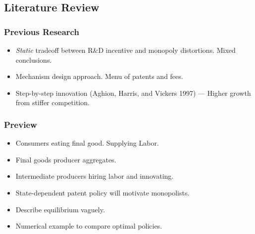 \documentclass{beamer}
\begin{document}
\subsection{Literature Review}
\label{sub:literature_review}
\begin{frame}[t]\frametitle{Previous Research} 
  \begin{itemize}
    \item<+-> \emph{Static} tradeoff between R\&D incentive and monopoly distortions. Mixed conclusions.
    \item<+-> Mechanism design approach.  Menu of patents and fees.
    \item<+-> Step-by-step innovation (Aghion, Harris, and Vickers 1997) --- Higher growth from stiffer competition.
  \end{itemize}
\end{frame}



\begin{frame}[t]\frametitle{Preview}
    
\begin{itemize}
  \item Consumers eating final good. Supplying Labor.
  \item Final goods producer aggregates.
  \item Intermediate producers hiring labor and innovating.
  \item State-dependent patent policy will motivate monopolists.
  \item Describe equilibrium vaguely.
  \item Numerical example to compare optimal policies.
\end{itemize}
\end{frame}
\end{document}
